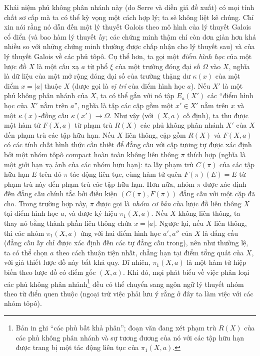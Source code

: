 \documentclass[11pt,twoside,openany]{book}
\numberwithin{equation}{section}
\newcommand{\src}[1]{%
  \phantomsection\hypertarget{src:\fgasourceid:#1}{}%
  \marginpar{\raggedleft\footnotesize\sffamily #1}%
}
\newcommand{\fgasourceid}{unset}
\begin{document}
\src{210}
Khái niệm phủ không phân nhánh này (do Serre và diễn giả đề xuất) có mọi tính
chất sơ cấp mà ta có thể kỳ vọng một cách hợp lý; ta sẽ không liệt kê chúng.
Chỉ xin nói rằng nó dẫn đến một lý thuyết Galois theo mô hình của lý thuyết
Galois cổ điển (và bao hàm lý thuyết ấy; các chứng minh thậm chí còn đơn giản
hơn khá nhiều so với những chứng minh thường được chấp nhận cho lý thuyết sau) và của lý thuyết
Galois về các phủ tôpô. Cụ thể hơn, ta gọi một \emph{điểm hình học} của một
lược đồ $X$ là một cấu xạ $a$ từ phổ $\xi$ của một trường đóng đại số $\Omega$
vào $X$, nghĩa là dữ liệu của một mở rộng đóng đại số của trường thặng dư
$\kappa(x)$ của một điểm $x=|a|$ thuộc $X$ (được gọi là \emph{vị trí} của
điểm hình học $a$). Nếu $X'$ là một phủ không phân nhánh của $X$, ta có thể
gắn với nó tập $E_a(X')$ các “điểm hình học của $X'$ nằm trên $a$”, nghĩa là
tập các cặp gồm một $x'\in X'$ nằm trên $x$ và một $\kappa(x)$-đồng cấu
$\kappa(x')\longrightarrow\Omega$. Như vậy (với $(X,a)$ cố định), ta thu được
một hàm tử $F(X,a)$ từ phạm trù $R(X)$ các phủ không phân nhánh $X'$ của $X$
đến phạm trù các tập hữu hạn. Nếu $X$ liên thông, cặp gồm $R(X)$ và $F(X,a)$
có các tính chất hình thức cần thiết để đẳng cấu với cặp tương tự được xác định
bởi một nhóm tôpô compact hoàn toàn không liên thông $\pi$ thích hợp (nghĩa là
một giới hạn xạ ảnh của các nhóm hữu hạn): ta lấy phạm trù $C(\pi)$ của các tập
hữu hạn $E$ trên đó $\pi$ tác động liên tục, cùng hàm tử quên
$F(\pi)(E)=E$ từ phạm trù này đến phạm trù các tập hữu hạn. Hơn nữa, nhóm
$\pi$ được xác định đến đẳng cấu chính tắc bởi điều kiện $(C(\pi),F(\pi))$
đẳng cấu với một cặp đã cho. Trong trường hợp này, $\pi$ được gọi là
\emph{nhóm cơ bản} của lược đồ liên thông $X$ tại điểm hình học $a$, và được
ký hiệu $\pi_1(X,a)$. Nếu $X$ không liên thông, ta thay nó bằng thành phần liên
thông chứa $x=|a|$. Ngược lại, nếu $X$ liên thông, thì các nhóm $\pi_1(X,a)$
ứng với hai điểm hình học $a',a''$ của $X$ là đẳng cấu (đẳng cấu ấy chỉ được
xác định đến các tự đẳng cấu trong), nên như thường lệ, ta có thể chọn $a$
theo cách thuận tiện nhất, chẳng hạn tại điểm tổng quát của $X$, với giả thiết
lược đồ này bất khả quy. Dĩ nhiên, $\pi_1(X,a)$ là một hàm tử hiệp biến theo lược
đồ có điểm gốc $(X,a)$. Khi đó, mọi phát biểu về việc phân loại các phủ không
phân nhánh\footnote{Bản in ghi “các phủ bất khả phân”; đoạn văn đang xét phạm
trù $R(X)$ của các phủ không phân nhánh và sự tương đương của nó với các tập
hữu hạn được trang bị một tác động liên tục của $\pi_1(X,a)$.} đều có thể
chuyển sang ngôn ngữ lý thuyết nhóm theo từ điển quen thuộc (ngoại trừ việc
phải lưu ý rằng ở đây ta làm việc với các nhóm tôpô).
\end{document}
